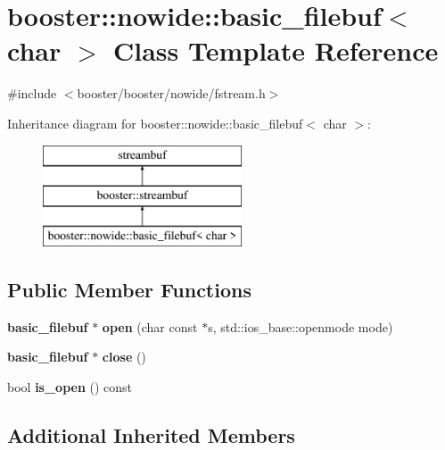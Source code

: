 \section{booster\+:\+:nowide\+:\+:basic\+\_\+filebuf$<$ char $>$ Class Template Reference}
\label{classbooster_1_1nowide_1_1basic__filebuf_3_01char_01_4}


{\ttfamily \#include $<$booster/booster/nowide/fstream.\+h$>$}

Inheritance diagram for booster\+:\+:nowide\+:\+:basic\+\_\+filebuf$<$ char $>$\+:\begin{figure}[H]
\begin{center}
\leavevmode
\includegraphics[height=3.000000cm]{classbooster_1_1nowide_1_1basic__filebuf_3_01char_01_4}
\end{center}
\end{figure}
\subsection*{Public Member Functions}
\begin{DoxyCompactItemize}
\item 
{\bf basic\+\_\+filebuf} $\ast$ {\bfseries open} (char const $\ast$s, std\+::ios\+\_\+base\+::openmode mode)\label{classbooster_1_1nowide_1_1basic__filebuf_3_01char_01_4_af53fd41ad94523460647b3a95411a548}

\item 
{\bf basic\+\_\+filebuf} $\ast$ {\bfseries close} ()\label{classbooster_1_1nowide_1_1basic__filebuf_3_01char_01_4_aae0ace743846530c663c267010470126}

\item 
bool {\bfseries is\+\_\+open} () const \label{classbooster_1_1nowide_1_1basic__filebuf_3_01char_01_4_a8c0ba603f3592a54d624e0d91bfab624}

\end{DoxyCompactItemize}
\subsection*{Additional Inherited Members}



